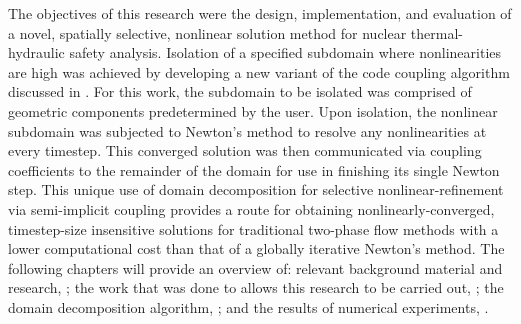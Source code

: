 The objectives of this research were the design, implementation, and evaluation of a novel, spatially selective, nonlinear solution method for nuclear thermal-hydraulic safety analysis.
Isolation of a specified subdomain where nonlinearities are high was achieved by developing a new variant of the code coupling algorithm discussed in .
For this work, the subdomain to be isolated was comprised of geometric components predetermined by the user.
Upon isolation, the nonlinear subdomain was subjected to Newton's method to resolve any nonlinearities at every timestep.
This converged solution was then communicated via coupling coefficients to the remainder of the domain for use in finishing its single Newton step.
This unique use of domain decomposition for selective nonlinear-refinement via semi-implicit coupling provides a route for obtaining nonlinearly-converged, timestep-size insensitive solutions for traditional two-phase flow methods with a lower computational cost than that of a globally iterative Newton's method.
The following chapters will provide an overview of: relevant background material and research, ; the work that was done to allows this research to be carried out, ; the domain decomposition algorithm, ; and the results of numerical experiments, .
